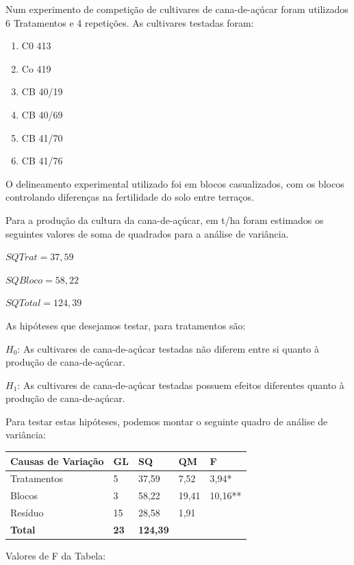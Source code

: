 \documentclass[
]{book}
\providecommand{\tightlist}{%
  \setlength{\itemsep}{0pt}\setlength{\parskip}{0pt}}
\begin{document}
Num experimento de competição de cultivares de cana-de-açúcar foram utilizados 6 Tratamentos e 4 repetições. As cultivares testadas foram:

\begin{enumerate}
\def\labelenumi{\arabic{enumi})}
\tightlist
\item
  C0 413
\item
  Co 419
\item
  CB 40/19
\item
  CB 40/69
\item
  CB 41/70
\item
  CB 41/76
\end{enumerate}

O delineamento experimental utilizado foi em blocos casualizados, com os blocos controlando diferenças na fertilidade do solo entre terraços.

Para a produção da cultura da cana-de-açúcar, em t/ha foram estimados os seguintes valores de soma de quadrados para a análise de variância.

\(SQ{Trat} =37,59\)

\(SQ{Bloco} =58,22\)

\(SQ{Total} =124,39\)

As hipóteses que desejamos testar, para tratamentos são:

\(H_0\): As cultivares de cana-de-açúcar testadas não diferem entre si quanto à produção de cana-de-açúcar.

\(H_1\): As cultivares de cana-de-açúcar testadas possuem efeitos diferentes quanto à produção de cana-de-açúcar.

Para testar estas hipóteses, podemos montar o seguinte quadro de análise de variância:

\begin{table}[H]
\centering
\begin{tabular}{l|l|l|l|l}
\hline
Causas de Variação & GL & SQ & QM & F\\
\hline
Tratamentos & 5 & 37,59 & 7,52 & 3,94*\\
\hline
Blocos & 3 & 58,22 & 19,41 & 10,16**\\
\hline
Resíduo & 15 & 28,58 & 1,91 & \\
\hline
\textbf{Total} & \textbf{23} & \textbf{124,39} & \textbf{} & \textbf{}\\
\hline
\end{tabular}
\end{table}

Valores de F da Tabela:
\end{document}

